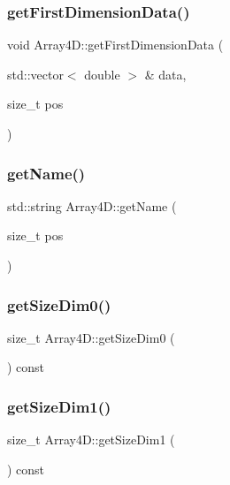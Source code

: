 \subsubsection{\texorpdfstring{get\+First\+Dimension\+Data()}{getFirstDimensionData()}}
{\footnotesize\ttfamily void Array4\+D\+::get\+First\+Dimension\+Data (\begin{DoxyParamCaption}\item[{std\+::vector$<$ double $>$ \&}]{data,  }\item[{size\+\_\+t}]{pos }\end{DoxyParamCaption})}

\mbox{\label{class_array4_d_a21932242976a122108f7cdf845f7aeca}} 
\subsubsection{\texorpdfstring{get\+Name()}{getName()}}
{\footnotesize\ttfamily std\+::string Array4\+D\+::get\+Name (\begin{DoxyParamCaption}\item[{size\+\_\+t}]{pos }\end{DoxyParamCaption})}

\mbox{\label{class_array4_d_afc2d361e388a5faba62caef697033911}} 
\subsubsection{\texorpdfstring{get\+Size\+Dim0()}{getSizeDim0()}}
{\footnotesize\ttfamily size\+\_\+t Array4\+D\+::get\+Size\+Dim0 (\begin{DoxyParamCaption}{ }\end{DoxyParamCaption}) const}

\mbox{\label{class_array4_d_a32f89196e8a5384f8a207812376f716d}} 
\subsubsection{\texorpdfstring{get\+Size\+Dim1()}{getSizeDim1()}}
{\footnotesize\ttfamily size\+\_\+t Array4\+D\+::get\+Size\+Dim1 (\begin{DoxyParamCaption}{ }\end{DoxyParamCaption}) const}

